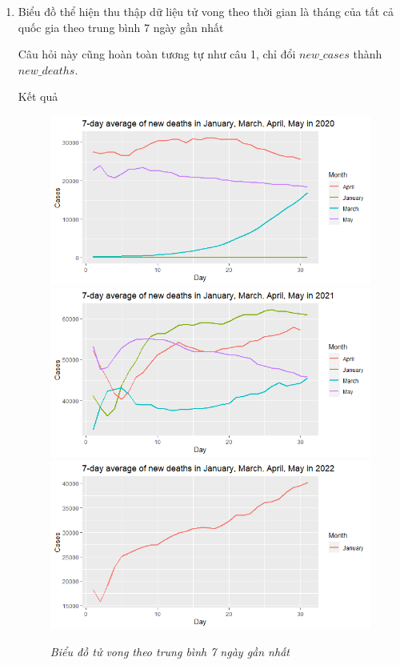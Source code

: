 \documentclass[a4paper]{article}
\theoremstyle{definition}
\begin{document}
\begin{enumerate}[1)]
    \item Biểu đồ thể hiện thu thập dữ liệu tử vong theo thời gian là tháng của tất cả quốc gia theo trung bình 7 ngày gần nhất
    
    Câu hỏi này cũng hoàn toàn tương tự như câu 1, chỉ đổi $new\_cases$ thành $new\_deaths$.
    
    Kết quả
    \begin{figure}[H]
        \begin{center}
        \includegraphics[scale = .5]{viii/2020deaths.png}
        \includegraphics[scale = .5]{viii/2021deaths.png}
        \includegraphics[scale = .5]{viii/2022deaths.png}
        \end{center}
        \vspace{+3mm}\caption{\it Biểu đồ tử vong theo trung bình 7 ngày gần nhất}
    \end{figure}
    

\end{enumerate}
\end{document}
